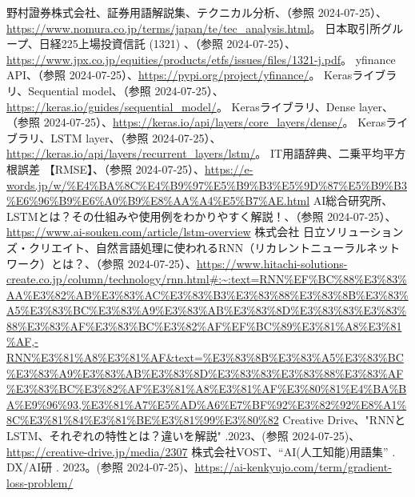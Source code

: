 \documentclass[a4paper, 11pt, titlepage]{jsarticle}
\begin{document}
\begin{thebibliography}{99}
   野村證券株式会社、証券用語解説集、テクニカル分析、（参照 2024-07-25）、\url{https://www.nomura.co.jp/terms/japan/te/tec_analysis.html}。
   日本取引所グループ、日経225上場投資信託 (1321) 、（参照 2024-07-25）、\url{https://www.jpx.co.jp/equities/products/etfs/issues/files/1321-j.pdf}。
   yfinance API、（参照 2024-07-25）、\url{https://pypi.org/project/yfinance/}。
   Kerasライブラリ、Sequential model、（参照 2024-07-25）、\url{https://keras.io/guides/sequential_model/}。
   Kerasライブラリ、Dense layer、（参照 2024-07-25）、\url{https://keras.io/api/layers/core_layers/dense/}。
   Kerasライブラリ、LSTM layer、（参照 2024-07-25）、\url{https://keras.io/api/layers/recurrent_layers/lstm/}。
   IT用語辞典、二乗平均平方根誤差 【RMSE】、（参照 2024-07-25）、\url{https://e-words.jp/w/%E4%BA%8C%E4%B9%97%E5%B9%B3%E5%9D%87%E5%B9%B3%E6%96%B9%E6%A0%B9%E8%AA%A4%E5%B7%AE.html}
   AI総合研究所、LSTMとは？その仕組みや使用例をわかりやすく解説！、（参照 2024-07-25）、\url{https://www.ai-souken.com/article/lstm-overview}
   株式会社 日立ソリューションズ・クリエイト、自然言語処理に使われるRNN（リカレントニューラルネットワーク）とは？、（参照 2024-07-25）、\url{https://www.hitachi-solutions-create.co.jp/column/technology/rnn.html#:~:text=RNN%EF%BC%88%E3%83%AA%E3%82%AB%E3%83%AC%E3%83%B3%E3%83%88%E3%83%8B%E3%83%A5%E3%83%BC%E3%83%A9%E3%83%AB%E3%83%8D%E3%83%83%E3%83%88%E3%83%AF%E3%83%BC%E3%82%AF%EF%BC%89%E3%81%A8%E3%81%AF,-RNN%E3%81%A8%E3%81%AF&text=%E3%83%8B%E3%83%A5%E3%83%BC%E3%83%A9%E3%83%AB%E3%83%8D%E3%83%83%E3%83%88%E3%83%AF%E3%83%BC%E3%82%AF%E3%81%A8%E3%81%AF%E3%80%81%E4%BA%BA%E9%96%93,%E3%81%A7%E5%AD%A6%E7%BF%92%E3%82%92%E8%A1%8C%E3%81%84%E3%81%BE%E3%81%99%E3%80%82}
   Creative Drive、"RNNとLSTM、それぞれの特性とは？違いを解説" .2023、(参照 2024-07-25)、\url{https://creative-drive.jp/media/2307}
   株式会社VOST、“AI(人工知能)用語集” . DX/AI研 . 2023。(参照 2024-07-25)、\url{https://ai-kenkyujo.com/term/gradient-loss-problem/}
\end{thebibliography}
\end{document}
